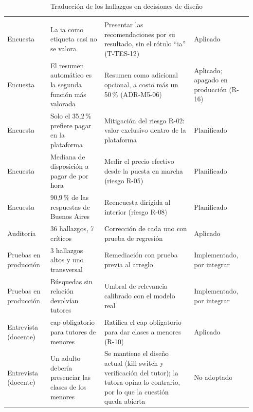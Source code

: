 {\small
\begin{xltabular}{\textwidth}{>{\raggedright\arraybackslash}p{2.1cm} L L >{\raggedright\arraybackslash}p{2.6cm}}
    \caption{Traducción de los hallazgos en decisiones de diseño}
    \label{tab:feedback-decisiones} \\
        \toprule
         &  &  &  \\
        \midrule
        \endfirsthead
        \toprule
         &  &  &  \\
        \midrule
        \endhead
        \bottomrule
        \endfoot
        Encuesta & La \gls{ia} como etiqueta casi no se valora & Presentar las recomendaciones por su resultado, sin el rótulo ``\gls{ia}'' (T-TES-12) & Aplicado \\
        Encuesta & El resumen automático es la segunda función más valorada & Resumen como adicional opcional, a costo más un 50\,\% (ADR-M5-06) & Aplicado; apagado en producción (R-16) \\
        Encuesta & Solo el 35,2\,\% prefiere pagar en la plataforma & Mitigación del riesgo R-02: valor exclusivo dentro de la plataforma & Planificado \\
        Encuesta & Mediana de disposición a pagar de  por hora & Medir el precio efectivo desde la puesta en marcha (riesgo R-05) & Planificado \\
        Encuesta & 90,9\,\% de las respuestas de Buenos Aires & Reencuesta dirigida al interior (riesgo R-08) & Planificado \\
        Auditoría & 36 hallazgos, 7 críticos & Corrección de cada uno con prueba de regresión & Aplicado \\
        Pruebas en producción & 3 hallazgos altos y uno transversal & Remediación con prueba previa al arreglo & Implementado, por integrar \\
        Pruebas en producción & Búsquedas sin relación devolvían tutores & Umbral de relevancia calibrado con el modelo real & Implementado, por integrar \\
        Entrevista (docente) & \gls{cap} obligatorio para tutores de menores & Ratifica el \gls{cap} obligatorio para dar clases a menores (R-10) & Aplicado \\
        Entrevista (docente) & Un adulto debería presenciar las clases de los menores & Se mantiene el diseño actual (kill-switch y verificación del tutor); la tutora opina lo contrario, por lo que la cuestión queda abierta & No adoptado \\

\end{xltabular}}
